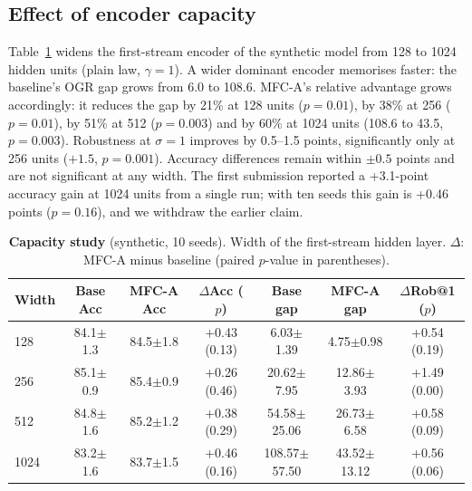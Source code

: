 \documentclass[fleqn,10pt]{wlscirep}
\begin{document}
\subsection*{Effect of encoder capacity}
Table~\ref{tab:capacity} widens the first-stream encoder of the synthetic model from 128 to 1024 hidden units (plain law, $\gamma{=}1$). A wider dominant encoder memorises faster: the baseline's OGR gap grows from 6.0 to 108.6. MFC-A's relative advantage grows accordingly: it reduces the gap by 21\% at 128 units ($p{=}0.01$), by 38\% at 256 ($p{=}0.01$), by 51\% at 512 ($p{=}0.003$) and by 60\% at 1024 units (108.6 to 43.5, $p{=}0.003$). Robustness at $\sigma{=}1$ improves by 0.5--1.5 points, significantly only at 256 units ($+1.5$, $p{=}0.001$). Accuracy differences remain within $\pm0.5$ points and are not significant at any width. The first submission reported a +3.1-point accuracy gain at 1024 units from a single run; with ten seeds this gain is +0.46 points ($p{=}0.16$), and we withdraw the earlier claim.

\begin{table}[t]
\caption{\textbf{Capacity study} (synthetic, 10 seeds). Width of the first-stream hidden layer. $\Delta$: MFC-A minus baseline (paired $p$-value in parentheses).}
\label{tab:capacity}
\centering
\footnotesize
\setlength{\tabcolsep}{2.5pt}
\begin{tabular}{@{}lcccccc@{}}
\toprule
\textbf{Width} & \textbf{Base Acc} & \textbf{MFC-A Acc} & \textbf{$\Delta$Acc ($p$)} & \textbf{Base gap} & \textbf{MFC-A gap} & \textbf{$\Delta$Rob@1 ($p$)} \\ \midrule
128 & 84.1$\pm$1.3 & 84.5$\pm$1.8 & +0.43 (0.13) & 6.03$\pm$1.39 & 4.75$\pm$0.98 & +0.54 (0.19) \\
256 & 85.1$\pm$0.9 & 85.4$\pm$0.9 & +0.26 (0.46) & 20.62$\pm$7.95 & 12.86$\pm$3.93 & +1.49 (0.00) \\
512 & 84.8$\pm$1.6 & 85.2$\pm$1.2 & +0.38 (0.29) & 54.58$\pm$25.06 & 26.73$\pm$6.58 & +0.58 (0.09) \\
1024 & 83.2$\pm$1.6 & 83.7$\pm$1.5 & +0.46 (0.16) & 108.57$\pm$57.50 & 43.52$\pm$13.12 & +0.56 (0.06) \\
\bottomrule
\end{tabular}
\end{table}
\end{document}
